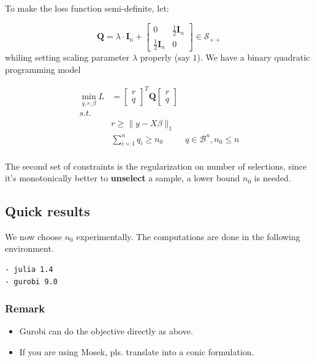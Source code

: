 \documentclass[
  10pt,
  a4paper,
,tablecaptionabove
]{scrartcl}
\providecommand{\tightlist}{%
  \setlength{\itemsep}{0pt}\setlength{\parskip}{0pt}}
\begin{document}
To make the loss function semi-definite, let:

\[\mathbf{Q} = \lambda\cdot \mathbf{I}_n + \begin{bmatrix} 0 & \frac{1}{2}\mathbf{I}_n\\  \frac{1}{2}\mathbf{I}_n &0 \end{bmatrix} \in \mathcal{S}_{++}\]
whiling setting scaling parameter \(\lambda\) properly (say \(1\)). We
have a binary quadratic programming model

\[\begin{aligned}\min_{q,r,\beta} L &=\begin{bmatrix} r\\q \end{bmatrix}^T\mathbf{Q}\begin{bmatrix} r\\q \end{bmatrix} \\ s.t. &\\ &r \ge \|y-X\beta\|_1\\ & \sum_{i=1}^n q_i \ge n_0 &q \in \mathcal{B}^n, n_0 \le n \\\end{aligned}\]

The second set of constraints is the regularization on number of
selections, since it's monotonically better to \textbf{unselect} a
sample, a lower bound \(n_0\) is needed.

\hypertarget{quick-results}{%
\subsection{Quick results}\label{quick-results}}

We now choose \(n_0\) experimentally. The computations are done in the
following environment.

\begin{verbatim}
- julia 1.4
- gurobi 9.0
\end{verbatim}

\hypertarget{remark}{%
\subsubsection{Remark}\label{remark}}

\begin{itemize}
\tightlist
\item
  Gurobi can do the objective directly as above.
\item
  If you are using Mosek, pls. translate into a conic formulation.
\end{itemize}
\end{document}
